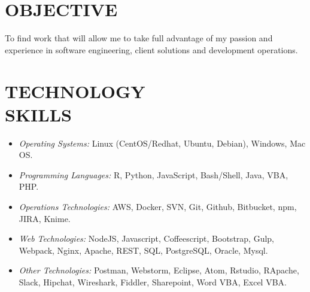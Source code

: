 \documentclass[margin, 10pt]{res} %
\begin{document}
\begin{resume}

 
\section{OBJECTIVE}  

To find work that will allow me to take full advantage of my passion and experience in software engineering, client solutions and development operations. 


\section{TECHNOLOGY \\ SKILLS} 
\begin{itemize}[leftmargin=*, label={}, noitemsep, labelindent=-5pt,itemindent=-10pt] 
\item {\sl Operating Systems:} Linux (CentOS/Redhat, Ubuntu, Debian), Windows, Mac OS. 
\item {\sl Programming Languages:} R, Python, JavaScript, Bash/Shell, Java, VBA, PHP. 
\item {\sl Operations Technologies:} AWS, Docker, SVN, Git, Github, Bitbucket, npm, JIRA, Knime. 
\item {\sl Web Technologies:} NodeJS, Javascript, Coffeescript, Bootstrap, Gulp, Webpack, Nginx, Apache, REST, SQL, PostgreSQL, Oracle, Mysql. 
\item {\sl Other Technologies:} Postman, Webstorm, Eclipse, Atom, Rstudio, RApache, Slack, Hipchat, Wireshark, Fiddler, Sharepoint, Word VBA, Excel VBA. 
\end{itemize}



\end{resume}
\end{document}
